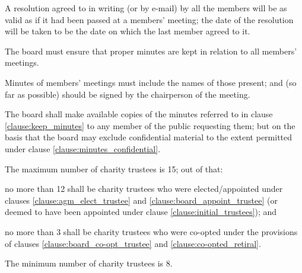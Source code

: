 ﻿\documentclass[a4paper,11pt,onecolumn ]{article}
\begin{document}
\begin{legal}
\item A resolution agreed to in writing (or by e-mail) by all the members will be as valid as if it had been passed at a members’ meeting; the date of the resolution will be taken to be the date on which the last member agreed to it.
\end{legal}

\begin{legal}
\item \label{clause:keep_minutes} The board must ensure that proper minutes are kept in relation to all members' meetings.
\item Minutes of members' meetings must include the names of those present; and (so far as possible) should be signed by the chairperson of the meeting.
\item The board shall make available copies of the minutes referred to in clause \ref{clause:keep_minutes} to any member of the public requesting them; but on the basis that the board may exclude confidential material to the extent permitted under clause \ref{clause:minutes_confidential}.
\end{legal}


\begin{legal}
\item \label{clause:max_trustees} The maximum number of charity trustees is 15; out of that:
    \begin{legal}
        \item no more than 12 shall be charity trustees who were elected\slash appointed under clauses \ref{clause:agm_elect_trustee} and \ref{clause:board_appoint_trustee} (or deemed to have been appointed under clause \ref{clause:initial_trustees}); and 
        \item no more than 3 shall be charity trustees who were co-opted under the provisions of clauses \ref{clause:board_co-opt_trustee} and \ref{clause:co-opted_retiral}.  
    \end{legal}
\item The minimum number of charity trustees is 8.
\end{legal}
\end{document}
